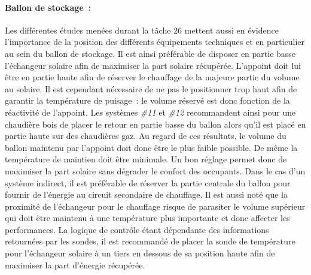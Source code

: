 \paragraph{Ballon de stockage~:} %
\label{par:ballon_de_stockage}
Les différentes études menées durant la tâche $26$ mettent aussi en évidence l’importance
de la position des différents équipements techniques et en particulier au sein du ballon
de stockage. Il est ainsi préférable de disposer en partie basse l’échangeur solaire
afin de maximiser la part solaire récupérée. L’appoint doit lui être en partie haute afin de réserver
le chauffage de la majeure partie du volume au solaire. Il est cependant nécessaire
de ne pas le positionner trop haut afin de garantir la température de puisage~: le volume
réservé est donc fonction de la réactivité de l’appoint. Les systèmes \emph{\#11} et
\emph{\#12} recommandent ainsi pour une chaudière bois de placer le retour en partie
basse du ballon alors qu’il est placé en partie haute sur des chaudières gaz.
Au regard de ces résultats, le volume du ballon maintenu par l’appoint doit donc
être le plus faible possible. De même la température de maintien doit être minimale.
Un bon réglage permet donc de maximiser la part solaire sans dégrader le confort des occupants.
Dans le cas d’un système indirect, il est préférable de réserver la partie centrale
du ballon
pour fournir de l’énergie au circuit secondaire de chauffage. Il est aussi noté que
la proximité de l’échangeur pour le chauffage risque de parasiter le volume supérieur
qui doit être maintenu à une température plus importante et donc affecter les performances.
La logique de contrôle étant dépendante des informations retournées par les sondes, il est
recommandé de placer la sonde de température pour l’échangeur solaire à un tiers
en dessous de sa position haute afin de maximiser la part d’énergie récupérée.

